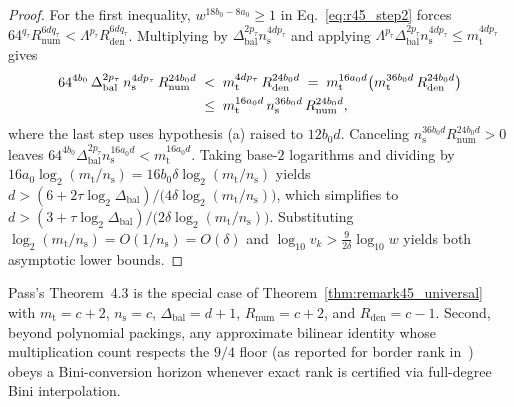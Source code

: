 \documentclass[11pt,a4paper]{article}
\theoremstyle{plain}
\theoremstyle{definition}
\theoremstyle{remark}
\begin{document}
\begin{proof}
For the first inequality, $w^{18 b_0 - 8 a_0} \ge 1$ in Eq.~\eqref{eq:r45_step2} forces $64^{q_\tau} R_{\mathrm{num}}^{6 d q_\tau} < \Lambda^{p_\tau} R_{\mathrm{den}}^{6 d q_\tau}$. Multiplying by $\Delta_{\mathrm{bal}}^{2 p_\tau} n_{\mathrm{s}}^{4 d p_\tau}$ and applying $\Lambda^{p_\tau} \Delta_{\mathrm{bal}}^{2 p_\tau} n_{\mathrm{s}}^{4 d p_\tau} \le m_{\mathrm{t}}^{4 d p_\tau}$ gives
\begin{align}
    64^{4 b_0}\,\Delta_{\mathrm{bal}}^{2 p_\tau}\,n_{\mathrm{s}}^{4 d p_\tau}\,R_{\mathrm{num}}^{24 b_0 d}
    &\;<\; m_{\mathrm{t}}^{4 d p_\tau}\,R_{\mathrm{den}}^{24 b_0 d}
    \;=\; m_{\mathrm{t}}^{16 a_0 d}\bigl(m_{\mathrm{t}}^{36 b_0 d}\,R_{\mathrm{den}}^{24 b_0 d}\bigr) \notag\\
    &\;\le\; m_{\mathrm{t}}^{16 a_0 d}\,n_{\mathrm{s}}^{36 b_0 d}\,R_{\mathrm{num}}^{24 b_0 d} ,
    \label{eq:r45_round}
\end{align}
where the last step uses hypothesis (a) raised to $12 b_0 d$. Canceling $n_{\mathrm{s}}^{36 b_0 d} R_{\mathrm{num}}^{24 b_0 d} > 0$ leaves $64^{4 b_0} \Delta_{\mathrm{bal}}^{2 p_\tau} n_{\mathrm{s}}^{16 a_0 d} < m_{\mathrm{t}}^{16 a_0 d}$. Taking base-$2$ logarithms and dividing by $16 a_0 \log_2(m_{\mathrm{t}}/n_{\mathrm{s}}) = 16 b_0 \delta \log_2(m_{\mathrm{t}}/n_{\mathrm{s}})$ yields $d > (6 + 2\tau\log_2 \Delta_{\mathrm{bal}}) / \bigl(4\delta\log_2(m_{\mathrm{t}}/n_{\mathrm{s}})\bigr)$, which simplifies to $d > (3 + \tau\log_2 \Delta_{\mathrm{bal}}) / \bigl(2\delta\log_2(m_{\mathrm{t}}/n_{\mathrm{s}})\bigr)$. Substituting $\log_2(m_{\mathrm{t}}/n_{\mathrm{s}}) = O(1/n_{\mathrm{s}}) = O(\delta)$ and $\log_{10} v_k > \frac{9}{2\delta}\log_{10} w$ yields both asymptotic lower bounds.
\end{proof}

Pass's Theorem~4.3 is the special case of Theorem~\ref{thm:remark45_universal} with $m_{\mathrm{t}} = c + 2$, $n_{\mathrm{s}} = c$, $\Delta_{\mathrm{bal}} = d + 1$, $R_{\mathrm{num}} = c + 2$, and $R_{\mathrm{den}} = c - 1$. Second, beyond polynomial packings, any approximate bilinear identity whose multiplication count respects the $9/4$ floor (as reported for border rank in~\cite{OpenAI2026Lower}) obeys a Bini-conversion horizon whenever exact rank is certified via full-degree Bini interpolation.
\end{document}
